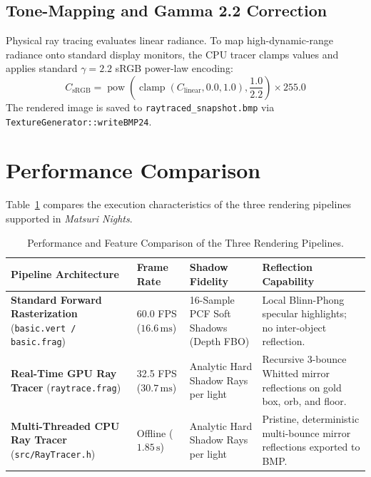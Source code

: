 \subsection{Tone-Mapping and Gamma 2.2 Correction}
Physical ray tracing evaluates linear radiance. To map high-dynamic-range radiance onto standard display monitors, the CPU tracer clamps values and applies standard $\gamma = 2.2$ sRGB power-law encoding:
\begin{equation}
C_{\text{sRGB}} = \operatorname{pow}\left( \operatorname{clamp}(C_{\text{linear}}, 0.0, 1.0), \frac{1.0}{2.2} \right) \times 255.0
\end{equation}
The rendered image is saved to \texttt{raytraced\_snapshot.bmp} via \texttt{TextureGenerator::writeBMP24}.

\section{Performance Comparison}
Table~\ref{tab:rendering_performance} compares the execution characteristics of the three rendering pipelines supported in \textit{Matsuri Nights}.

\begin{table}[htbp]
\centering
\footnotesize
\renewcommand{\arraystretch}{0.92}
\begin{tabularx}{\textwidth}{p{3.8cm} p{2.2cm} p{3.2cm} p{5.5cm}}
\toprule
\textbf{Pipeline Architecture} & \textbf{Frame Rate} & \textbf{Shadow Fidelity} & \textbf{Reflection Capability} \\
\midrule
\textbf{Standard Forward Rasterization} \newline (\texttt{basic.vert / basic.frag}) &
60.0 FPS \newline ($16.6\,\text{ms}$) &
16-Sample PCF Soft Shadows (Depth FBO) &
Local Blinn-Phong specular highlights; no inter-object reflection. \\
\addlinespace
\textbf{Real-Time GPU Ray Tracer} \newline (\texttt{raytrace.frag}) &
32.5 FPS \newline ($30.7\,\text{ms}$) &
Analytic Hard Shadow Rays per light &
Recursive 3-bounce Whitted mirror reflections on gold box, orb, and floor. \\
\addlinespace
\textbf{Multi-Threaded CPU Ray Tracer} \newline (\texttt{src/RayTracer.h}) &
Offline \newline ($1.85\,\text{s}$) &
Analytic Hard Shadow Rays per light &
Pristine, deterministic multi-bounce mirror reflections exported to BMP. \\
\bottomrule
\end{tabularx}
\caption{Performance and Feature Comparison of the Three Rendering Pipelines.}
\label{tab:rendering_performance}
\end{table}

